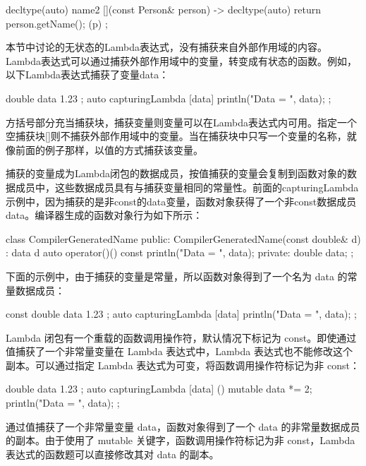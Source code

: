 \begin{cpp}
decltype(auto) name2 { [](const Person& person) -> decltype(auto) {
        return person.getName(); }(p) };
\end{cpp}

本节中讨论的无状态的Lambda表达式，没有捕获来自外部作用域的内容。Lambda表达式可以通过捕获外部作用域中的变量，转变成有状态的函数。例如，以下Lambda表达式捕获了变量data：

\begin{cpp}
double data { 1.23 };
auto capturingLambda { [data]{ println("Data = {}", data); } };
\end{cpp}

方括号部分充当捕获块，捕获变量则变量可以在Lambda表达式内可用。指定一个空捕获块[]则不捕获外部作用域中的变量。当在捕获块中只写一个变量的名称，就像前面的例子那样，以值的方式捕获该变量。

捕获的变量成为Lambda闭包的数据成员，按值捕获的变量会复制到函数对象的数据成员中，这些数据成员具有与捕获变量相同的常量性。前面的capturingLambda示例中，因为捕获的是非const的data变量，函数对象获得了一个非const数据成员data。编译器生成的函数对象行为如下所示：

\begin{cpp}
class CompilerGeneratedName
{
    public:
        CompilerGeneratedName(const double& d) : data { d } {}
        auto operator()() const { println("Data = {}", data); }
    private:
        double data;
};
\end{cpp}

下面的示例中，由于捕获的变量是常量，所以函数对象得到了一个名为 data 的常量数据成员：

\begin{cpp}
const double data { 1.23 };
auto capturingLambda { [data]{ println("Data = {}", data); } };
\end{cpp}

Lambda 闭包有一个重载的函数调用操作符，默认情况下标记为 const。即使通过值捕获了一个非常量变量在 Lambda 表达式中，Lambda 表达式也不能修改这个副本。可以通过指定 Lambda 表达式为可变，将函数调用操作符标记为非 const：

\begin{cpp}
double data { 1.23 };
auto capturingLambda {
    [data] () mutable { data *= 2; println("Data = {}", data); } };
\end{cpp}

通过值捕获了一个非常量变量 data，函数对象得到了一个 data 的非常量数据成员的副本。由于使用了 mutable 关键字，函数调用操作符标记为非 const，Lambda 表达式的函数题可以直接修改其对 data 的副本。

